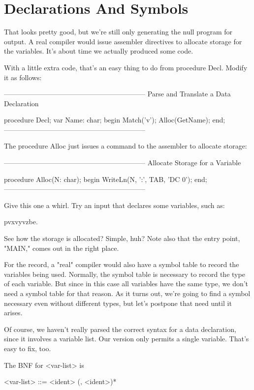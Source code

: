 \documentclass[float=false, crop=false]{standalone}
\begin{document}
\section{Declarations And Symbols}

That looks pretty good, but we're still only generating the null program for
output. A real compiler would issue assembler directives to allocate storage for
the variables. It's about time we actually produced some code.

With a little extra code, that's an easy thing to do from procedure Decl. Modify
it as follows:


{--------------------------------------------------------------}
{ Parse and Translate a Data Declaration }

procedure Decl;
var Name: char;
begin
   Match('v');
   Alloc(GetName);
end;
{--------------------------------------------------------------}


The procedure Alloc just  issues  a  command  to the assembler to
allocate storage:


{--------------------------------------------------------------}
{ Allocate Storage for a Variable }

procedure Alloc(N: char);
begin
   WriteLn(N, ':', TAB, 'DC 0');
end;
{--------------------------------------------------------------}


Give  this  one  a  whirl.    Try  an  input  that declares  some
variables, such as:

     pvxvyvzbe.

See how the storage is allocated?    Simple, huh?  Note also that
the entry point, "MAIN," comes out in the right place.

For the record, a "real" compiler would also have a  symbol table
to record the variables being used.  Normally,  the  symbol table
is necessary to record the type  of  each variable.  But since in
this case  all  variables  have  the  same  type, we don't need a
symbol  table  for  that reason.  As it turns out, we're going to
find a symbol  necessary  even without different types, but let's
postpone that need until it arises.

Of course, we haven't really parsed the correct syntax for a data declaration,
since it involves a variable list. Our version only permits a single variable.
That's easy to fix, too.

The BNF for <var-list> is


     <var-list> ::= <ident> (, <ident>)*
\end{document}
